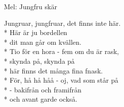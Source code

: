 \begin{SongText}[Bordellvisa]
    \begin{SongInfo}
        Mel: Jungfru skär
    \end{SongInfo}
    \begin{SongVerse}
        Jungruar, jungfruar, det finns inte här.\\*%
        Här är ju bordellen\\*%
        dit man går om kvällen.\\*%
        Tio för en hora - fem om du är rask,\\*%
        skynda på, skynda  på\\*%
        här finns det många fina fnask.\\*%
        För, hå hå håå - oj, vad som står på\\*%
        - bakifrån och framifrån\\*%
        och avant garde också.
    \end{SongVerse}
\end{SongText}
